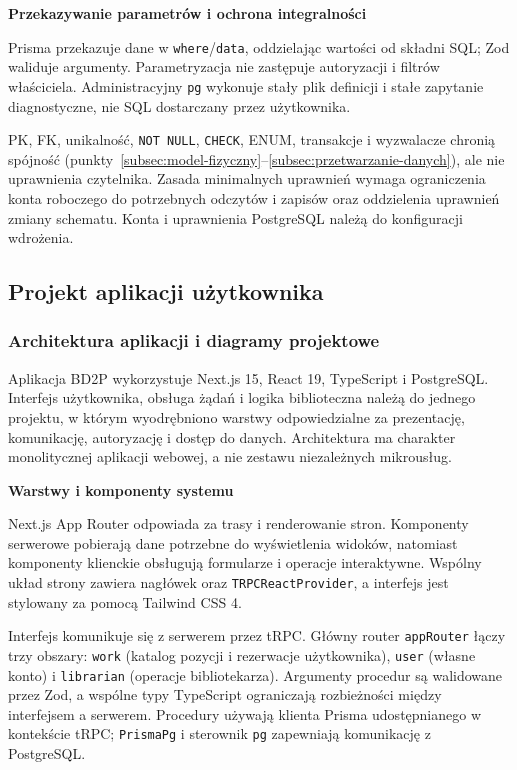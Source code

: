 \documentclass[11pt, a4paper]{article}
\begin{document}
\noindent\textbf{Przekazywanie parametrów i ochrona integralności}

Prisma przekazuje dane w \texttt{where}/\texttt{data}, oddzielając wartości od składni SQL; Zod waliduje argumenty. Parametryzacja nie zastępuje autoryzacji i filtrów właściciela. Administracyjny \texttt{pg} wykonuje stały plik definicji i stałe zapytanie diagnostyczne, nie SQL dostarczany przez użytkownika.

PK, FK, unikalność, \texttt{NOT NULL}, \texttt{CHECK}, ENUM, transakcje i wyzwalacze chronią spójność (punkty~\ref{subsec:model-fizyczny}--\ref{subsec:przetwarzanie-danych}), ale nie uprawnienia czytelnika. Zasada minimalnych uprawnień wymaga ograniczenia konta roboczego do potrzebnych odczytów i zapisów oraz oddzielenia uprawnień zmiany schematu. Konta i uprawnienia PostgreSQL należą do konfiguracji wdrożenia.


\subsection{Projekt aplikacji użytkownika}

\subsubsection{Architektura aplikacji i diagramy projektowe}
\label{subsec:architektura-aplikacji}

Aplikacja BD2P wykorzystuje Next.js 15, React 19, TypeScript i PostgreSQL. Interfejs użytkownika, obsługa żądań i logika biblioteczna należą do jednego projektu, w którym wyodrębniono warstwy odpowiedzialne za prezentację, komunikację, autoryzację i dostęp do danych. Architektura ma charakter monolitycznej aplikacji webowej, a nie zestawu niezależnych mikrousług.

\noindent\textbf{Warstwy i komponenty systemu}

Next.js App Router odpowiada za trasy i renderowanie stron. Komponenty serwerowe pobierają dane potrzebne do wyświetlenia widoków, natomiast komponenty klienckie obsługują formularze i operacje interaktywne. Wspólny układ strony zawiera nagłówek oraz \texttt{TRPCReactProvider}, a interfejs jest stylowany za pomocą Tailwind CSS 4.

Interfejs komunikuje się z serwerem przez tRPC. Główny router \texttt{appRouter} łączy trzy obszary: \texttt{work} (katalog pozycji i rezerwacje użytkownika), \texttt{user} (własne konto) i \texttt{librarian} (operacje bibliotekarza). Argumenty procedur są walidowane przez Zod, a wspólne typy TypeScript ograniczają rozbieżności między interfejsem a serwerem. Procedury używają klienta Prisma udostępnianego w kontekście tRPC; \texttt{PrismaPg} i sterownik \texttt{pg} zapewniają komunikację z PostgreSQL.
\end{document}
